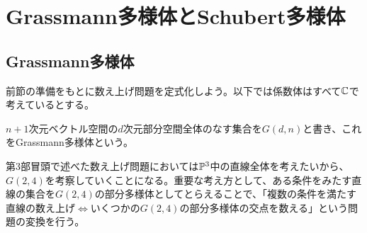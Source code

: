 \documentclass{ltjsreport}
\begin{document}
\section{Grassmann多様体とSchubert多様体}
\subsection{Grassmann多様体}

前節の準備をもとに数え上げ問題を定式化しよう。以下では係数体はすべて$\mathbb{C}$で考えているとする。

\begin{defin}
  $n+1$次元ベクトル空間の$d$次元部分空間全体のなす集合を$G(d,n)$と書き、これをGrassmann多様体という。
\end{defin}

第3部冒頭で述べた数え上げ問題においては$\mathbb{P}^3$中の直線全体を考えたいから、$G(2,4)$を考察していくことになる。重要な考え方として、ある条件をみたす直線の集合を$G(2,4)$の部分多様体としてとらえることで、「複数の条件を満たす直線の数え上げ$\Leftrightarrow$いくつかの$G(2,4)$の部分多様体の交点を数える」という問題の変換を行う。


  
\end{document}
